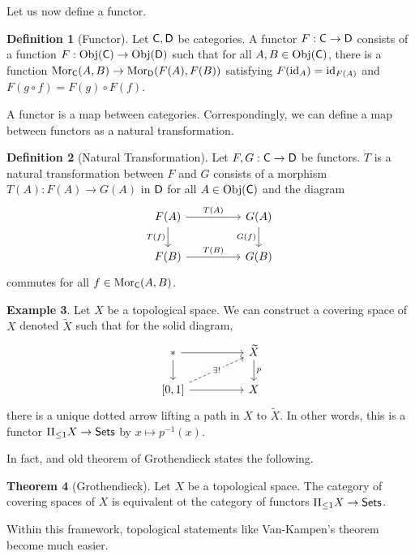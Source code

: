 \documentclass{amsart}
\theoremstyle{definition}
\newtheorem{theorem}{Theorem}[section]
\newtheorem{example}[theorem]{Example}
\newtheorem{definition}[theorem]{Definition}
\numberwithin{equation}{section}
\begin{document}
Let us now define a functor. 
\begin{definition}[Functor]
  Let $\mathsf{C},\mathsf{D}$ be categories. A functor $F:\mathsf{C}\to\mathsf{D}$ consists of a function $F:\mathrm{Obj}(\mathsf{C})\to\mathrm{Obj}(\mathsf{D})$ such that for all $A,B\in\mathrm{Obj}(\mathsf{C})$, there is a function $\mathrm{Mor}_{\mathsf{C}}(A,B)\to\mathrm{Mor}_{\mathsf{D}}(F(A),F(B))$ satisfying $F(\mathrm{id}_{A})=\mathrm{id}_{F(A)}$ and $F(g\circ f)=F(g)\circ F(f)$. 
\end{definition}
A functor is a map between categories. Correspondingly, we can define a map between functors as a natural transformation. 
\begin{definition}[Natural Transformation]
Let $F,G:\mathsf{C}\to\mathsf{D}$ be functors. $T$ is a natural transformation between $F$ and $G$ consists of a morphism $T(A):F(A)\to G(A)$ in $\mathsf{D}$ for all $A\in\mathrm{Obj}(\mathsf{C})$ and the diagram
$$\begin{tikzcd}
	{F(A)} && {G(A)} \\
	{F(B)} && {G(B)}
	\arrow["{T(A)}", from=1-1, to=1-3]
	\arrow["{T(B)}", from=2-1, to=2-3]
	\arrow["{T(f)}"', from=1-1, to=2-1]
	\arrow["{G(f)}"', from=1-3, to=2-3]
\end{tikzcd}$$
commutes for all $f\in\mathrm{Mor}_{\mathsf{C}}(A,B)$. 
\end{definition}
\begin{example}
  Let $X$ be a topological space. We can construct a covering space of $X$ denoted $\widetilde{X}$ such that for the solid diagram, 
  $$%
  \begin{tikzcd}
    {*} && {\widetilde{X}} \\
    {[0,1]} && X
    \arrow[from=1-1, to=1-3]
    \arrow["p", from=1-3, to=2-3]
    \arrow[from=1-1, to=2-1]
    \arrow[from=2-1, to=2-3]
    \arrow["{\exists!}"{description}, dashed, from=2-1, to=1-3]
  \end{tikzcd}$$
  there is a unique dotted arrow lifting a path in $X$ to $\widetilde{X}$. In other words, this is a functor $\Pi_{\leq 1}X\to\mathsf{Sets}$ by $x\mapsto p^{-1}(x)$. 
\end{example}
In fact, and old theorem of Grothendieck states the following. 
\begin{theorem}[Grothendieck]
  Let $X$ be a topological space. The category of covering spaces of $X$ is equivalent ot the category of functors $\Pi_{\leq 1}X\to\mathsf{Sets}$. 
\end{theorem}
Within this framework, topological statements like Van-Kampen's theorem become much easier. 
\end{document}
